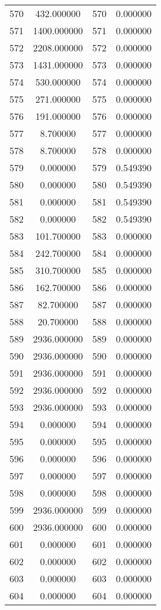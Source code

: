 \documentclass[12pt]{article}
\begin{document}
\begin{longtable}{@{}cccc@{}}
570 & 432.000000 & 570 & 0.000000 \\
571 & 1400.000000 & 571 & 0.000000 \\
572 & 2208.000000 & 572 & 0.000000 \\
573 & 1431.000000 & 573 & 0.000000 \\
574 & 530.000000 & 574 & 0.000000 \\
575 & 271.000000 & 575 & 0.000000 \\
576 & 191.000000 & 576 & 0.000000 \\
577 & 8.700000 & 577 & 0.000000 \\
578 & 8.700000 & 578 & 0.000000 \\
579 & 0.000000 & 579 & 0.549390 \\
580 & 0.000000 & 580 & 0.549390 \\
581 & 0.000000 & 581 & 0.549390 \\
582 & 0.000000 & 582 & 0.549390 \\
583 & 101.700000 & 583 & 0.000000 \\
584 & 242.700000 & 584 & 0.000000 \\
585 & 310.700000 & 585 & 0.000000 \\
586 & 162.700000 & 586 & 0.000000 \\
587 & 82.700000 & 587 & 0.000000 \\
588 & 20.700000 & 588 & 0.000000 \\
589 & 2936.000000 & 589 & 0.000000 \\
590 & 2936.000000 & 590 & 0.000000 \\
591 & 2936.000000 & 591 & 0.000000 \\
592 & 2936.000000 & 592 & 0.000000 \\
593 & 2936.000000 & 593 & 0.000000 \\
594 & 0.000000 & 594 & 0.000000 \\
595 & 0.000000 & 595 & 0.000000 \\
596 & 0.000000 & 596 & 0.000000 \\
597 & 0.000000 & 597 & 0.000000 \\
598 & 0.000000 & 598 & 0.000000 \\
599 & 2936.000000 & 599 & 0.000000 \\
600 & 2936.000000 & 600 & 0.000000 \\
601 & 0.000000 & 601 & 0.000000 \\
602 & 0.000000 & 602 & 0.000000 \\
603 & 0.000000 & 603 & 0.000000 \\
604 & 0.000000 & 604 & 0.000000 \\

\end{longtable}
\end{document}
